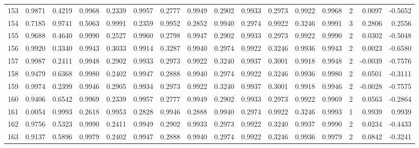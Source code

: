 \begin{tabular}{lrrrrrrrrrrrrrrr}
153 &      0.9871 &  0.4219 &  0.9968 &  0.2339 &  0.9957 &  0.2777 &  0.9949 &  0.2902 &  0.9933 &  0.2973 &   0.9922 &     0.9968 &      2 &                    0.0097 &                    -0.5652 \\
154 &      0.7185 &  0.9741 &  0.5063 &  0.9991 &  0.2359 &  0.9952 &  0.2852 &  0.9940 &  0.2974 &  0.9922 &   0.3246 &     0.9991 &      3 &                    0.2806 &                     0.2556 \\
155 &      0.9688 &  0.4640 &  0.9990 &  0.2527 &  0.9960 &  0.2798 &  0.9947 &  0.2902 &  0.9933 &  0.2973 &   0.9922 &     0.9990 &      2 &                    0.0302 &                    -0.5048 \\
156 &      0.9920 &  0.3340 &  0.9943 &  0.3033 &  0.9914 &  0.3287 &  0.9940 &  0.2974 &  0.9922 &  0.3246 &   0.9936 &     0.9943 &      2 &                    0.0023 &                    -0.6580 \\
157 &      0.9987 &  0.2411 &  0.9948 &  0.2902 &  0.9933 &  0.2973 &  0.9922 &  0.3240 &  0.9937 &  0.3001 &   0.9918 &     0.9948 &      2 &                   -0.0039 &                    -0.7576 \\
158 &      0.9479 &  0.6368 &  0.9980 &  0.2402 &  0.9947 &  0.2888 &  0.9940 &  0.2974 &  0.9922 &  0.3246 &   0.9936 &     0.9980 &      2 &                    0.0501 &                    -0.3111 \\
159 &      0.9974 &  0.2399 &  0.9946 &  0.2905 &  0.9934 &  0.2973 &  0.9922 &  0.3240 &  0.9937 &  0.3001 &   0.9918 &     0.9946 &      2 &                   -0.0028 &                    -0.7575 \\
160 &      0.9406 &  0.6542 &  0.9969 &  0.2339 &  0.9957 &  0.2777 &  0.9949 &  0.2902 &  0.9933 &  0.2973 &   0.9922 &     0.9969 &      2 &                    0.0563 &                    -0.2864 \\
161 &      0.0054 &  0.9993 &  0.2618 &  0.9953 &  0.2828 &  0.9946 &  0.2888 &  0.9940 &  0.2974 &  0.9922 &   0.3246 &     0.9993 &      1 &                    0.9939 &                     0.9939 \\
162 &      0.9756 &  0.5323 &  0.9990 &  0.2411 &  0.9949 &  0.2902 &  0.9933 &  0.2973 &  0.9922 &  0.3240 &   0.9937 &     0.9990 &      2 &                    0.0234 &                    -0.4433 \\
163 &      0.9137 &  0.5896 &  0.9979 &  0.2402 &  0.9947 &  0.2888 &  0.9940 &  0.2974 &  0.9922 &  0.3246 &   0.9936 &     0.9979 &      2 &                    0.0842 &                    -0.3241 \\

\end{tabular}
